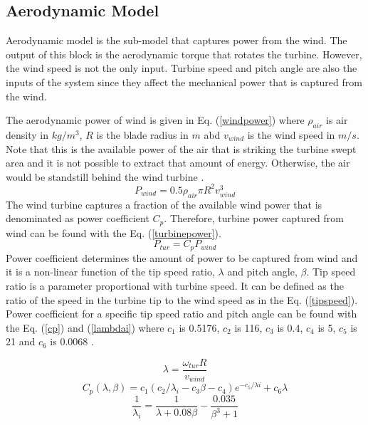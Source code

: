 \subsection{Aerodynamic Model}
Aerodynamic model is the sub-model that captures power from the wind. The output of this block is the aerodynamic torque that rotates the turbine. However, the wind speed is not the only input. Turbine speed and pitch angle are also the inputs of the system since they affect the mechanical power that is captured from the wind.\par
The aerodynamic power of wind is given in Eq. (\ref{windpower}) where $\rho_{air}$ is air density in $kg/m^{3}$, $R$ is the blade radius in $m$ abd $v_{wind}$ is the wind speed in $m/s$. Note that this is the available power of the air that is striking the turbine swept area and it is not possible to extract that amount of energy. Otherwise, the air would be standstill behind the wind turbine \cite{Ackermann2005a}.
\begin{equation}
P_{wind}=0.5\rho_{air}\pi R^{2} v_{wind}^{3}
\label{windpower}
\end{equation}
The wind turbine captures a fraction of the available wind power that is denominated as power coefficient $C_{p}$. Therefore, turbine power captured from wind can be found with the Eq. (\ref{turbinepower}).
\begin{equation}
P_{tur}=C_{p}P_{wind}
\label{turbinepower}
\end{equation}
Power coefficient determines the amount of power to be captured from wind and it is a non-linear function of the tip speed ratio, $\lambda$ and pitch angle, $\beta$. Tip speed ratio is a parameter proportional with turbine speed. It can be defined as the ratio of the speed in the turbine tip to the wind speed as in the Eq. (\ref{tipspeed}). Power coefficient for a specific tip speed ratio and pitch angle can be found with the Eq. (\ref{cp}) and (\ref{lambdai}) where $c_{1}$ is 0.5176, $c_{2}$ is 116, $c_{3}$ is 0.4, $c_{4}$ is 5, $c_{5}$ is 21 and $c_{6}$ is 0.0068 \cite{Heier}.\par
\begin{equation}
\lambda=\frac{\omega_{tur}R}{v_{wind}}
\label{tipspeed}
\end{equation}
\begin{equation}
C_{p}(\lambda,\beta)=c_{1}(c_{2}/\lambda_{i}-c_{3}\beta-c_{4})e^{-c_{5}/\lambda{i}}+c_{6}\lambda
\label{cp}
\end{equation}
\begin{equation}
\frac{1}{\lambda_{i}}=\frac{1}{\lambda+0.08\beta}-\frac{0.035}{\beta^{3}+1} 
\label{lambdai}
\end{equation}
